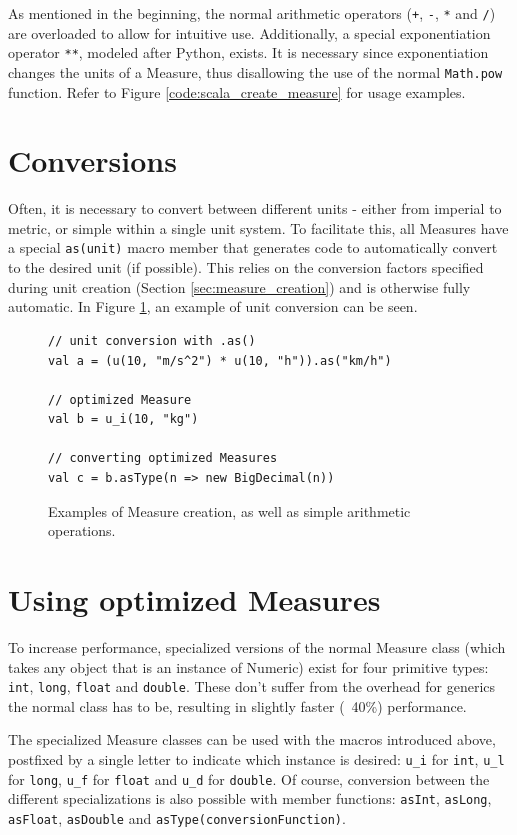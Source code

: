 \documentclass[12pt,oneside,a4paper]{scrbook}
\begin{document}
As mentioned in the beginning, the normal arithmetic operators (\verb|+|, \verb|-|, \verb|*| and \verb|/|) are overloaded to allow for intuitive use. Additionally, a special exponentiation operator \verb|**|, modeled after Python, exists. It is necessary since exponentiation changes the units of a Measure, thus disallowing the use of the normal \verb|Math.pow| function. Refer to Figure \ref{code:scala_create_measure} for usage examples.

\section{Conversions}

Often, it is necessary to convert between different units - either from imperial to metric, or simple within a single unit system. To facilitate this, all Measures have a special \verb|as(unit)| macro member that generates code to automatically convert to the desired unit (if possible). This relies on the conversion factors specified during unit creation (Section \ref{sec:measure_creation}) and is otherwise fully automatic. In Figure \ref{code:scala_measure_conversion}, an example of unit conversion can be seen.

\begin{figure}
\begin{verbatim}
// unit conversion with .as()
val a = (u(10, "m/s^2") * u(10, "h")).as("km/h")

// optimized Measure
val b = u_i(10, "kg")

// converting optimized Measures
val c = b.asType(n => new BigDecimal(n))
\end{verbatim}
\caption{Examples of Measure creation, as well as simple arithmetic operations.}
\label{code:scala_measure_conversion}
\end{figure}

\section{Using optimized Measures}

To increase performance, specialized versions of the normal Measure class (which takes any object that is an instance of Numeric)  exist for four primitive types: \verb|int|, \verb|long|, \verb|float| and \verb|double|. These don't suffer from the overhead for generics the normal class has to be, resulting in slightly faster (~40\%) performance.

The specialized Measure classes can be used with the macros introduced above, postfixed by a single letter to indicate which instance is desired: \verb|u_i| for \verb|int|, \verb|u_l| for \verb|long|, \verb|u_f| for \verb|float| and \verb|u_d| for \verb|double|. Of course, conversion between the different specializations is also possible with member functions: \verb|asInt|, \verb|asLong|, \verb|asFloat|, \verb|asDouble| and \verb|asType(conversionFunction)|.
\end{document}
